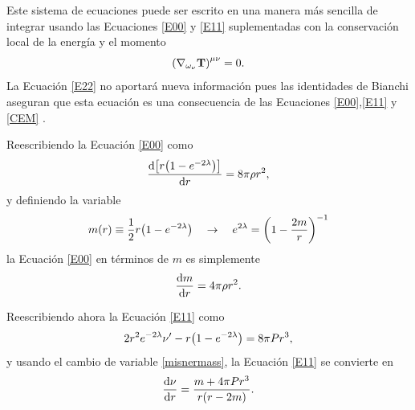 Este sistema de ecuaciones puede ser escrito en una manera más sencilla de integrar usando las Ecuaciones \eqref{E00} y \eqref{E11} suplementadas con la conservación local de la energía y el momento
\begin{equation}
    \qty(\nabla_{\omega_\nu}\mathbf{T})^{\mu \nu} = 0 \label{CEM}.
\end{equation}
La Ecuación \ref{E22} no aportará nueva información pues las identidades de Bianchi aseguran que esta ecuación es una consecuencia de las Ecuaciones \eqref{E00},\eqref{E11} y \eqref{CEM} \cite{Schutz2009}.
 
Reescribiendo la Ecuación \eqref{E00} como
\begin{equation*}
    \dv{\qty[r\qty(1-e^{-2\lambda})]}{r}=8\pi\rho r^2,
\end{equation*}
y definiendo la variable
\begin{equation}
    m(r) \equiv \frac{1}{2}r\qty(1-e^{-2\lambda}) \quad \rightarrow \quad e^{2\lambda} = \qty(1-\frac{2m}{r})^{-1} \label{misnermass} 
\end{equation}
la Ecuación \eqref{E00} en términos de $m$ es simplemente
\begin{equation}
    \dv{m}{r} = 4\pi \rho r^2. \label{dmtov}
\end{equation}

Reescribiendo ahora la Ecuación \eqref{E11} como
\begin{equation*}
    2 r^2 e^{-2\lambda} \nu^{\prime} - r\qty(1- e^{-2\lambda}) = 8\pi P r^3,
\end{equation*}
y usando el cambio de variable \eqref{misnermass}, la Ecuación \eqref{E11} se convierte en 
\begin{equation}
    \dv{\nu}{r}= \frac{m+4\pi P r^3}{r\qty(r-2m)}.\label{dnutov}
\end{equation}

